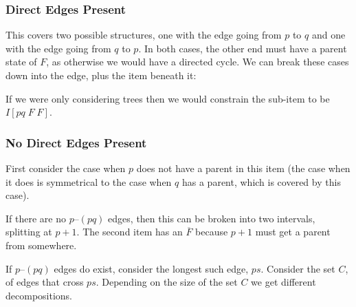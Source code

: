 \subsubsection{Direct Edges Present}

\begin{center}
\end{center}

This covers two possible structures, one with the edge going from $p$ to $q$ and one with the edge going from $q$ to $p$.
In both cases, the other end must have a parent state of $F$, as otherwise we would have a directed cycle.
We can break these cases down into the edge, plus the item beneath it:


If we were only considering trees then we would constrain the sub-item to be $I[pq \; F \; F]$.

\subsubsection{No Direct Edges Present}

First consider the case when $p$ does not have a parent in this item (the case when it does is symmetrical to the case when $q$ has a parent, which is covered by this case).

If there are no $p$--$(pq)$ edges, then this can be broken into two intervals, splitting at $p+1$.
The second item has an $\overline{F}$ because $p+1$ must get a parent from somewhere.


If $p$--$(pq)$ edges do exist, consider the longest such edge, $ps$.
Consider the set $C$, of edges that cross $ps$.
Depending on the size of the set $C$ we get different decompositions.

\begin{center}
\end{center}

